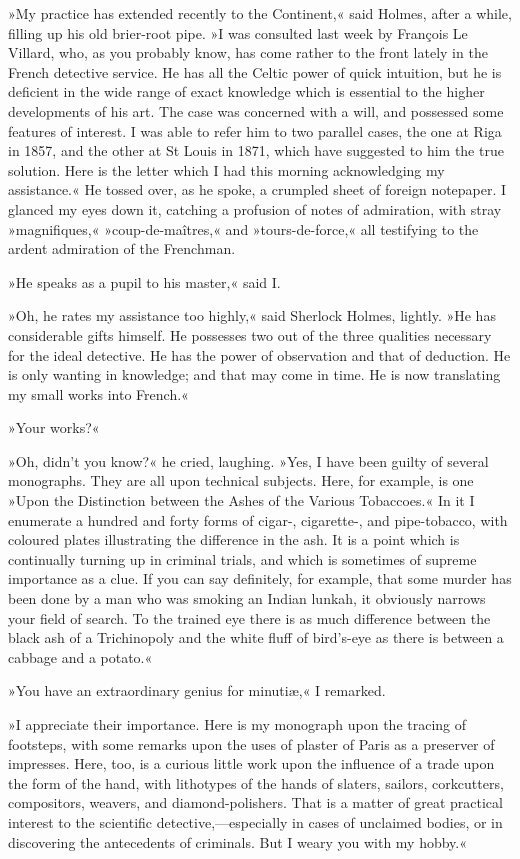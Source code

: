 »My practice has extended recently to the Continent,« said Holmes, after a while, filling up his old brier-root pipe. »I was consulted last week by François Le Villard, who, as you probably know, has come rather to the front lately in the French detective service. He has all the Celtic power of quick intuition, but he is deficient in the wide range of exact knowledge which is essential to the higher developments of his art. The case was concerned with a will, and possessed some features of interest. I was able to refer him to two parallel cases, the one at Riga in 1857, and the other at St Louis in 1871, which have suggested to him the true solution. Here is the letter which I had this morning acknowledging my assistance.« He tossed over, as he spoke, a crumpled sheet of foreign notepaper. I glanced my eyes down it, catching a profusion of notes of admiration, with stray »magnifiques,« »coup-de-maîtres,« and »tours-de-force,« all testifying to the ardent admiration of the Frenchman.

»He speaks as a pupil to his master,« said I.

»Oh, he rates my assistance too highly,« said Sherlock Holmes, lightly. »He has considerable gifts himself. He possesses two out of the three qualities necessary for the ideal detective. He has the power of observation and that of deduction. He is only wanting in knowledge; and that may come in time. He is now translating my small works into French.«

»Your works?«

»Oh, didn't you know?« he cried, laughing. »Yes, I have been guilty of several monographs. They are all upon technical subjects. Here, for example, is one »Upon the Distinction between the Ashes of the Various Tobaccoes.« In it I enumerate a hundred and forty forms of cigar-, cigarette-, and pipe-tobacco, with coloured plates illustrating the difference in the ash. It is a point which is continually turning up in criminal trials, and which is sometimes of supreme importance as a clue. If you can say definitely, for example, that some murder has been done by a man who was smoking an Indian lunkah, it obviously narrows your field of search. To the trained eye there is as much difference between the black ash of a Trichinopoly and the white fluff of bird's-eye as there is between a cabbage and a potato.«

»You have an extraordinary genius for minutiæ,« I remarked.

»I appreciate their importance. Here is my monograph upon the tracing of footsteps, with some remarks upon the uses of plaster of Paris as a preserver of impresses. Here, too, is a curious little work upon the influence of a trade upon the form of the hand, with lithotypes of the hands of slaters, sailors, corkcutters, compositors, weavers, and diamond-polishers. That is a matter of great practical interest to the scientific detective,—especially in cases of unclaimed bodies, or in discovering the antecedents of criminals. But I weary you with my hobby.«

